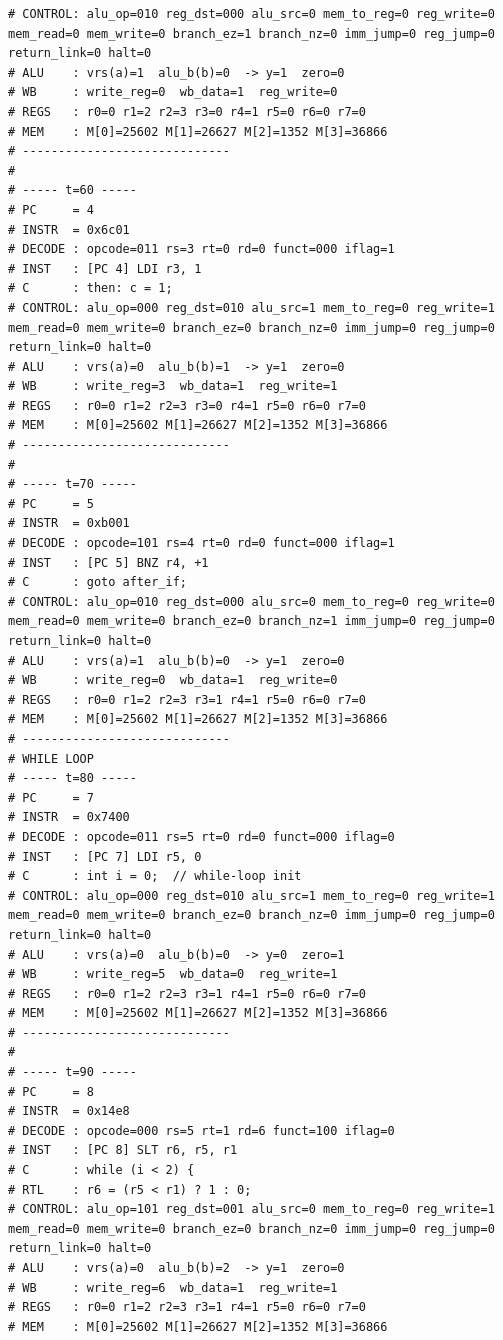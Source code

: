 \documentclass[12pt]{report}
\begin{document}
\begin{lstlisting}
# CONTROL: alu_op=010 reg_dst=000 alu_src=0 mem_to_reg=0 reg_write=0 mem_read=0 mem_write=0 branch_ez=1 branch_nz=0 imm_jump=0 reg_jump=0 return_link=0 halt=0
# ALU    : vrs(a)=1  alu_b(b)=0  -> y=1  zero=0
# WB     : write_reg=0  wb_data=1  reg_write=0
# REGS   : r0=0 r1=2 r2=3 r3=0 r4=1 r5=0 r6=0 r7=0
# MEM    : M[0]=25602 M[1]=26627 M[2]=1352 M[3]=36866
# -----------------------------
# 
# ----- t=60 -----
# PC     = 4
# INSTR  = 0x6c01
# DECODE : opcode=011 rs=3 rt=0 rd=0 funct=000 iflag=1
# INST   : [PC 4] LDI r3, 1
# C      : then: c = 1;
# CONTROL: alu_op=000 reg_dst=010 alu_src=1 mem_to_reg=0 reg_write=1 mem_read=0 mem_write=0 branch_ez=0 branch_nz=0 imm_jump=0 reg_jump=0 return_link=0 halt=0
# ALU    : vrs(a)=0  alu_b(b)=1  -> y=1  zero=0
# WB     : write_reg=3  wb_data=1  reg_write=1
# REGS   : r0=0 r1=2 r2=3 r3=0 r4=1 r5=0 r6=0 r7=0
# MEM    : M[0]=25602 M[1]=26627 M[2]=1352 M[3]=36866
# -----------------------------
# 
# ----- t=70 -----
# PC     = 5
# INSTR  = 0xb001
# DECODE : opcode=101 rs=4 rt=0 rd=0 funct=000 iflag=1
# INST   : [PC 5] BNZ r4, +1
# C      : goto after_if;
# CONTROL: alu_op=010 reg_dst=000 alu_src=0 mem_to_reg=0 reg_write=0 mem_read=0 mem_write=0 branch_ez=0 branch_nz=1 imm_jump=0 reg_jump=0 return_link=0 halt=0
# ALU    : vrs(a)=1  alu_b(b)=0  -> y=1  zero=0
# WB     : write_reg=0  wb_data=1  reg_write=0
# REGS   : r0=0 r1=2 r2=3 r3=1 r4=1 r5=0 r6=0 r7=0
# MEM    : M[0]=25602 M[1]=26627 M[2]=1352 M[3]=36866
# -----------------------------
# WHILE LOOP
# ----- t=80 -----
# PC     = 7
# INSTR  = 0x7400
# DECODE : opcode=011 rs=5 rt=0 rd=0 funct=000 iflag=0
# INST   : [PC 7] LDI r5, 0
# C      : int i = 0;  // while-loop init
# CONTROL: alu_op=000 reg_dst=010 alu_src=1 mem_to_reg=0 reg_write=1 mem_read=0 mem_write=0 branch_ez=0 branch_nz=0 imm_jump=0 reg_jump=0 return_link=0 halt=0
# ALU    : vrs(a)=0  alu_b(b)=0  -> y=0  zero=1
# WB     : write_reg=5  wb_data=0  reg_write=1
# REGS   : r0=0 r1=2 r2=3 r3=1 r4=1 r5=0 r6=0 r7=0
# MEM    : M[0]=25602 M[1]=26627 M[2]=1352 M[3]=36866
# -----------------------------
# 
# ----- t=90 -----
# PC     = 8
# INSTR  = 0x14e8
# DECODE : opcode=000 rs=5 rt=1 rd=6 funct=100 iflag=0
# INST   : [PC 8] SLT r6, r5, r1
# C      : while (i < 2) {
# RTL    : r6 = (r5 < r1) ? 1 : 0;
# CONTROL: alu_op=101 reg_dst=001 alu_src=0 mem_to_reg=0 reg_write=1 mem_read=0 mem_write=0 branch_ez=0 branch_nz=0 imm_jump=0 reg_jump=0 return_link=0 halt=0
# ALU    : vrs(a)=0  alu_b(b)=2  -> y=1  zero=0
# WB     : write_reg=6  wb_data=1  reg_write=1
# REGS   : r0=0 r1=2 r2=3 r3=1 r4=1 r5=0 r6=0 r7=0
# MEM    : M[0]=25602 M[1]=26627 M[2]=1352 M[3]=36866

\end{lstlisting}
\end{document}
